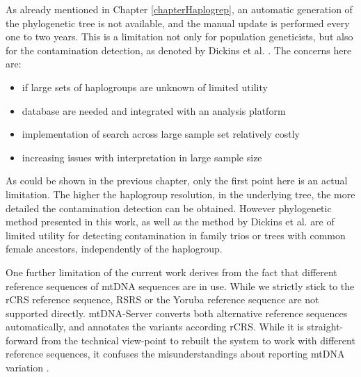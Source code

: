 As already mentioned in Chapter \ref{chapterHaplogrep}, an automatic generation of the phylogenetic tree is not available, and the manual update is performed every one to two years. This is a limitation not only for population geneticists, but also for the contamination detection, as denoted by Dickins et al. \cite{Dickins2014}. The concerns here are:
\begin{itemize}
\item if large sets of haplogroups are unknown of limited utility
\item database are needed and integrated with an analysis platform
\item implementation of search across large sample set relatively costly
\item increasing issues with interpretation in large sample size
\end{itemize}
As could be shown in the previous chapter, only the first point here is an actual limitation. The higher the haplogroup resolution, in the underlying tree, the more detailed the contamination detection can be obtained. However phylogenetic method presented in this work, as well as the method by Dickins et al. \cite{Dickins2014} are of limited utility for detecting contamination in family trios or trees with common female ancestors, independently of the haplogroup.

One further limitation of the current work derives from the fact that different reference sequences of mtDNA sequences are in use. While we strictly stick to the rCRS reference sequence, RSRS or the Yoruba reference sequence are not supported directly. mtDNA-Server converts both alternative reference sequences automatically, and annotates the variants according rCRS. While it is straight-forward from the technical view-point to rebuilt the system to work with different reference sequences, it confuses the misunderstandings about reporting mtDNA variation \cite{Bandelt2013}.

